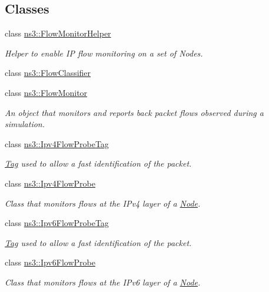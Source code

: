 \subsection*{Classes}
\begin{DoxyCompactItemize}
\item 
class \hyperlink{classns3_1_1FlowMonitorHelper}{ns3\+::\+Flow\+Monitor\+Helper}
\begin{DoxyCompactList}\small\item\em Helper to enable IP flow monitoring on a set of Nodes. \end{DoxyCompactList}\item 
class \hyperlink{classns3_1_1FlowClassifier}{ns3\+::\+Flow\+Classifier}
\item 
class \hyperlink{classns3_1_1FlowMonitor}{ns3\+::\+Flow\+Monitor}
\begin{DoxyCompactList}\small\item\em An object that monitors and reports back packet flows observed during a simulation. \end{DoxyCompactList}\item 
class \hyperlink{classns3_1_1Ipv4FlowProbeTag}{ns3\+::\+Ipv4\+Flow\+Probe\+Tag}
\begin{DoxyCompactList}\small\item\em \hyperlink{classns3_1_1Tag}{Tag} used to allow a fast identification of the packet. \end{DoxyCompactList}\item 
class \hyperlink{classns3_1_1Ipv4FlowProbe}{ns3\+::\+Ipv4\+Flow\+Probe}
\begin{DoxyCompactList}\small\item\em Class that monitors flows at the I\+Pv4 layer of a \hyperlink{classns3_1_1Node}{Node}. \end{DoxyCompactList}\item 
class \hyperlink{classns3_1_1Ipv6FlowProbeTag}{ns3\+::\+Ipv6\+Flow\+Probe\+Tag}
\begin{DoxyCompactList}\small\item\em \hyperlink{classns3_1_1Tag}{Tag} used to allow a fast identification of the packet. \end{DoxyCompactList}\item 
class \hyperlink{classns3_1_1Ipv6FlowProbe}{ns3\+::\+Ipv6\+Flow\+Probe}
\begin{DoxyCompactList}\small\item\em Class that monitors flows at the I\+Pv6 layer of a \hyperlink{classns3_1_1Node}{Node}. \end{DoxyCompactList}\end{DoxyCompactItemize}
